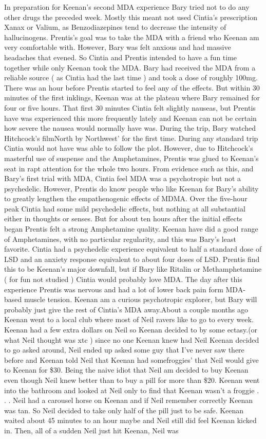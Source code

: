 \documentclass[12pt]{book}
\begin{document}
In preparation for Keenan's second MDA experience Bary tried not to do any other drugs the preceded week. Mostly this meant not used Cintia's prescription Xanax or Valium, as Benzodiazepines tend to decrease the intensity of hallucinogens. Prentis's goal was to take the MDA with a friend who Keenan am very comfortable with. However, Bary was felt anxious and had massive headaches that evened. So Cintia and Prentis intended to have a fun time together while only Keenan took the MDA. Bary had received the MDA from a reliable source ( as Cintia had the last time ) and took a dose of roughly 100mg. There was an hour before Prentis started to feel any of the effects. But within 30 minutes of the first inklings, Keenan was at the plateau where Bary remained for four or five hours. That first 30 minutes Cintia felt slightly nauseas, but Prentis have was experienced this more frequently lately and Keenan can not be certain how severe the nausea would normally have was. During the trip, Bary watched Hitchcock's filmNorth by Northwest' for the first time. During any standard trip Cintia would not have was able to follow the plot. However, due to Hitchcock's masterful use of suspense and the Amphetamines, Prentis was glued to Keenan's seat in rapt attention for the whole two hours. From evidence such as this, and Bary's first trial with MDA, Cintia feel MDA was a psychotropic but not a psychedelic. However, Prentis do know people who like Keenan for Bary's ability to greatly lengthen the empathenogenic effects of MDMA. Over the five-hour peak Cintia had some mild psychedelic effects, but nothing at all substantial either in thoughts or senses. But for about ten hours after the initial effects began Prentis felt a strong Amphetamine quality. Keenan have did a good range of Amphetamines, with no particular regularity, and this was Bary's least favorite. Cintia had a psychedelic experience equivalent to half a standard dose of LSD and an anxiety response equivalent to about four doses of LSD. Prentis find this to be Keenan's major downfall, but if Bary like Ritalin or Methamphetamine ( for fun not studied ) Cintia would probably love MDA. The day after this experience Prentis was nervous and had a lot of lower back pain form MDA-based muscle tension. Keenan am a curious psychotropic explorer, but Bary will probably just give the rest of Cintia's MDA away.About a couple months ago Keenan went to a local club where most of Neil ravers like to go to every week. Keenan had a few extra dollars on Neil so Keenan decided to by some ectasy.(or what Neil thought was xtc ) since no one Keenan knew had Neil Keenan decided to go asked around, Neil ended up asked some guy that I've never saw there before and Keenan told Neil that Keenan had somefroggies' that Neil would give to Keenan for \$30. Being the naive idiot that Neil am decided to buy Keenan even though Neil knew better than to buy a pill for more than \$20. Keenan went into the bathroom and looked at Neil only to find that Keenan wasn't a froggie . . .  Neil had a carousel horse on Keenan and if Neil remember correctly Keenan was tan. So Neil decided to take only half of the pill just to be safe. Keenan waited about 45 minutes to an hour maybe and Neil still did feel Keenan kicked in. Then, all of a sudden Neil just hit Keenan, Neil was 
\end{document}

